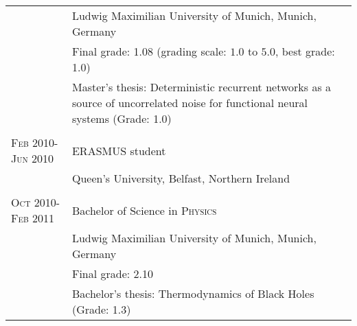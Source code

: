\begin{longtable}{>{\hfill}p{3.3cm}|p{12.0cm}}
  & \footnotesize Ludwig Maximilian University of Munich, Munich, Germany \\
  & \footnotesize Final grade: 1.08 (grading scale: $1.0$ to $5.0$, best grade: 1.0) \\
  & \footnotesize Master's thesis: Deterministic recurrent networks as
  a source of uncorrelated noise for
  functional neural systems (Grade: 1.0) \\
  \multicolumn{2}{c}{} \\
  \textsc{Feb} 2010-\textsc{Jun} 2010 & ERASMUS student \\
  & \footnotesize Queen's University, Belfast, Northern Ireland \\
  \multicolumn{2}{c}{} \\
  \textsc{Oct} 2010-\textsc{Feb} 2011 & Bachelor of Science in \textsc{Physics} \\
  & \footnotesize Ludwig Maximilian University of Munich, Munich, Germany \\
  & \footnotesize Final grade: 2.10 \\
  & \footnotesize Bachelor's thesis: Thermodynamics of Black Holes (Grade: 1.3) \\
\end{longtable}

